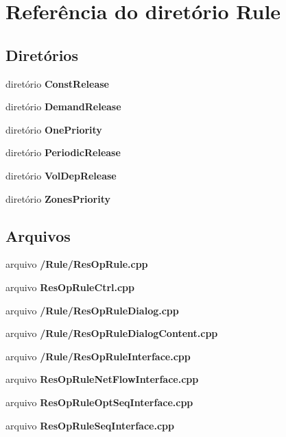 \section{Referência do diretório Rule}
\label{dir_9440a360d02b0402f7c30ae62d7320c8}
\subsection*{Diretórios}
\begin{DoxyCompactItemize}
\item 
diretório {\bf Const\+Release}
\item 
diretório {\bf Demand\+Release}
\item 
diretório {\bf One\+Priority}
\item 
diretório {\bf Periodic\+Release}
\item 
diretório {\bf Vol\+Dep\+Release}
\item 
diretório {\bf Zones\+Priority}
\end{DoxyCompactItemize}
\subsection*{Arquivos}
\begin{DoxyCompactItemize}
\item 
arquivo {\bf /\+Rule/\+Res\+Op\+Rule.\+cpp}
\item 
arquivo {\bf Res\+Op\+Rule\+Ctrl.\+cpp}
\item 
arquivo {\bf /\+Rule/\+Res\+Op\+Rule\+Dialog.\+cpp}
\item 
arquivo {\bf /\+Rule/\+Res\+Op\+Rule\+Dialog\+Content.\+cpp}
\item 
arquivo {\bf /\+Rule/\+Res\+Op\+Rule\+Interface.\+cpp}
\item 
arquivo {\bf Res\+Op\+Rule\+Net\+Flow\+Interface.\+cpp}
\item 
arquivo {\bf Res\+Op\+Rule\+Opt\+Seq\+Interface.\+cpp}
\item 
arquivo {\bf Res\+Op\+Rule\+Seq\+Interface.\+cpp}
\end{DoxyCompactItemize}
